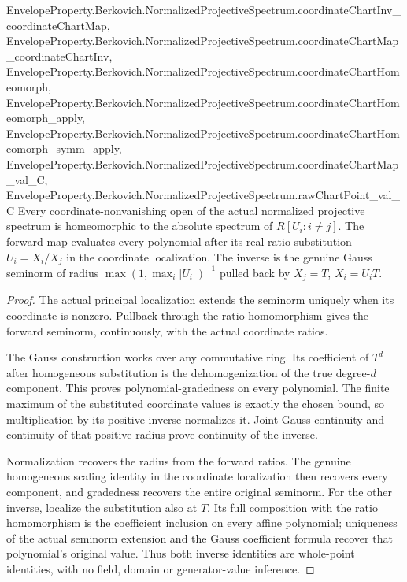 \begin{theorem}
{  EnvelopeProperty.Berkovich.NormalizedProjectiveSpectrum.coordinateChartInv_coordinateChartMap,
  EnvelopeProperty.Berkovich.NormalizedProjectiveSpectrum.coordinateChartMap_coordinateChartInv,
  EnvelopeProperty.Berkovich.NormalizedProjectiveSpectrum.coordinateChartHomeomorph,
  EnvelopeProperty.Berkovich.NormalizedProjectiveSpectrum.coordinateChartHomeomorph_apply,
  EnvelopeProperty.Berkovich.NormalizedProjectiveSpectrum.coordinateChartHomeomorph_symm_apply,
  EnvelopeProperty.Berkovich.NormalizedProjectiveSpectrum.coordinateChartMap_val_C,
  EnvelopeProperty.Berkovich.NormalizedProjectiveSpectrum.rawChartPoint_val_C}
\leanok
{}
Every coordinate-nonvanishing open of the actual normalized projective
spectrum is homeomorphic to the absolute spectrum of
$R[U_i:i\ne j]$. The forward map evaluates every polynomial after its real
ratio substitution $U_i=X_i/X_j$ in the coordinate localization. The
inverse is the genuine Gauss seminorm of radius
$\max(1,\max_i|U_i|)^{-1}$ pulled back by $X_j=T$, $X_i=U_iT$.
\end{theorem}
\begin{proof}
The actual principal localization extends the seminorm uniquely when its
coordinate is nonzero. Pullback through the ratio homomorphism gives the
forward seminorm, continuously, with the actual coordinate ratios.

The Gauss construction works over any commutative ring. Its coefficient
of $T^d$ after homogeneous substitution is the dehomogenization of the
true degree-$d$ component. This proves polynomial-gradedness on every
polynomial. The finite maximum of the substituted coordinate values is
exactly the chosen bound, so multiplication by its positive inverse
normalizes it. Joint Gauss continuity and continuity of that positive
radius prove continuity of the inverse.

Normalization recovers the radius from the forward ratios. The genuine
homogeneous scaling identity in the coordinate localization then recovers
every component, and gradedness recovers the entire original seminorm.
For the other inverse, localize the substitution also at $T$. Its full
composition with the ratio homomorphism is the coefficient inclusion
on every affine polynomial; uniqueness of the actual seminorm extension
and the Gauss coefficient formula recover that polynomial's original
value. Thus both inverse identities are whole-point identities, with no
field, domain or generator-value inference.
\end{proof}

